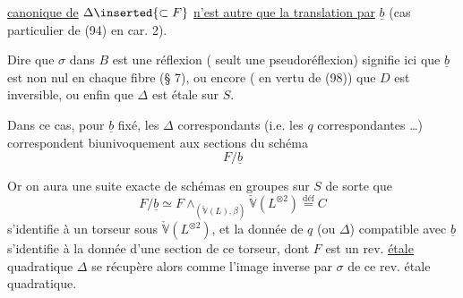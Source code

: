  \uline{canonique de} $\Delta\inserted{\subset F}$ \uline{n'est autre que la translation par} $\underline b$ (cas particulier de (94) en car. 2). 

Dire que $\sigma$ dans $B$ est une réflexion ( seult une pseudoréflexion) signifie ici que $\underline b$ est non nul en chaque fibre (§ 7), ou encore ( en vertu de (98)) que $D$ est   inversible, ou enfin que $\Delta$ est étale sur $S$.

Dans ce cas, pour $\underline b$ fixé, les $\Delta$ correspondants (i.e. les $q$ correspondantes \ldots) correspondent biunivoquement aux sections du schéma
\[F/\underline b\]

Or  on aura une suite exacte de schémas en groupes sur $S$
de sorte que
\[F/\underline b\simeq F\mathbin{\wedge}_{(\check{\mathbb V}(L),\beta)}\check{\mathbb V}(L^{\otimes2})\overset{\mathrm{déf}}=C\tag*{(102)}\]
s'identifie à un torseur  sous $\check{\mathbb V}(L^{\otimes2})$, et la donnée de $q$ (ou $\Delta$) compatible avec $\underline b$ s'identifie à la donnée d'une section \inserted{$\sigma$} de ce torseur, dont $F$ est un rev. \uline{étale} quadratique $\Delta$ se récupère alors comme l'image inverse par $\sigma$ de ce rev. étale quadratique.
